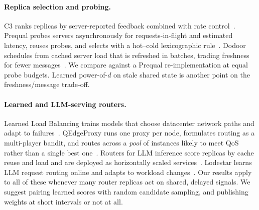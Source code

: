 \documentclass[10pt,twocolumn,letterpaper]{article}
\begin{document}
\paragraph{Replica selection and probing.} C3 ranks replicas by
server-reported feedback combined with rate control~\citep{c3nsdi2015}.
Prequal probes servers asynchronously for requests-in-flight and estimated
latency, reuses probes, and selects with a hot--cold lexicographic
rule~\citep{prequal2024}. Dodoor schedules from cached server load that is
refreshed in batches, trading freshness for fewer
messages~\citep{da2025dodoor}. We compare against a Prequal re-implementation
at equal probe budgets. Learned power-of-$d$ on stale shared state is another
point on the freshness/message trade-off.

\paragraph{Learned and LLM-serving routers.} Learned Load Balancing trains
models that choose datacenter network paths and adapt to
failures~\citep{chang2024llb}. QEdgeProxy runs one proxy per node, formulates
routing as a multi-player bandit, and routes across a \emph{pool} of instances
likely to meet QoS rather than a single best one~\citep{cilic2025qedgeproxy}.
Routers for LLM inference score replicas by cache reuse and load and are
deployed as horizontally scaled services~\citep{llmd,vllmrouter}. Lodestar
learns LLM request routing online and adapts to workload
changes~\citep{lodestar2026}. Our results apply to all of these whenever many
router replicas act on shared, delayed signals. We suggest pairing learned
scores with random candidate sampling, and publishing weights at short
intervals or not at all.
\end{document}
